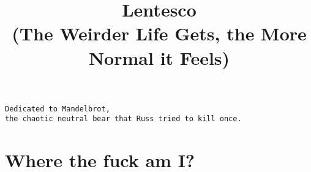 \documentclass[12pt]{book}
\title{\textbf{Lentesco} \\ \vspace{1em} 
\small{(The Weirder Life Gets, the More Normal it Feels)}}
\begin{document}
\maketitle
\newpage \vspace*{6cm}
\thispagestyle{empty}
\begin{center}
\texttt{Dedicated to Mandelbrot, \\ the chaotic neutral bear
that Russ tried to kill once.}
\end{center}
\chapter*{Where the fuck am I?}

\appendix
\chapter{}

\chapter{}

\end{document}
